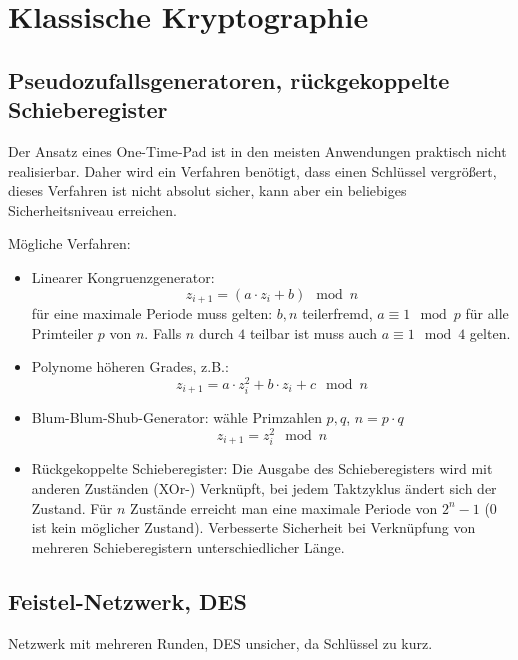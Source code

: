 \chapter{Klassische Kryptographie}
\section{Pseudozufallsgeneratoren, rückgekoppelte Schieberegister}
Der Ansatz eines One-Time-Pad ist in den meisten Anwendungen praktisch nicht realisierbar.
Daher wird ein Verfahren benötigt, dass einen Schlüssel vergrößert, dieses Verfahren
ist nicht absolut sicher, kann aber ein beliebiges Sicherheitsniveau erreichen.

Mögliche Verfahren:
\begin{itemize}
    \item Linearer Kongruenzgenerator:
        \begin{equation}
            z_{i+1} = (a \cdot z_i + b) \mod n
        \end{equation}
        für eine maximale Periode muss gelten: $b, n$ teilerfremd, $a \equiv 1 \mod p$ für alle Primteiler $p$ von $n$. Falls $n$ durch $4$ teilbar ist muss auch $a \equiv 1 \mod 4$ gelten.
    \item Polynome höheren Grades, z.B.:
        \begin{equation}
            z_{i+1} = a \cdot z_i^2 + b \cdot z_i + c \mod n
        \end{equation} 
    \item Blum-Blum-Shub-Generator: wähle Primzahlen $p, q$, $n=p\cdot q$        
        \begin{equation}
            z_{i+1} = z_i^2 \mod n
        \end{equation}
    \item Rückgekoppelte Schieberegister: 
        Die Ausgabe des Schieberegisters wird mit anderen Zuständen (XOr-) Verknüpft,
        bei jedem Taktzyklus ändert sich der Zustand. Für $n$ Zustände erreicht man eine
        maximale Periode von $2^n-1$ ($0$ ist kein möglicher Zustand). Verbesserte
        Sicherheit bei Verknüpfung von mehreren Schieberegistern unterschiedlicher
        Länge.
\end{itemize}

\section{Feistel-Netzwerk, DES}
Netzwerk mit mehreren Runden, DES unsicher, da Schlüssel zu kurz.

